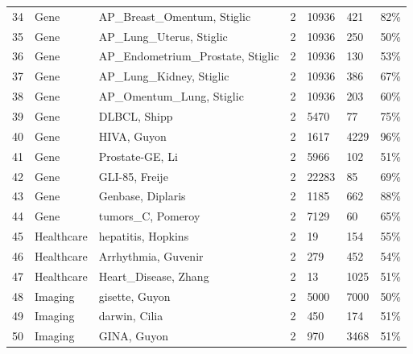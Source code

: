 \documentclass[preprint,12pt,authoryear]{elsarticle}
\begin{document}
{{\begin{longtable}{|c|p{1.9cm}|p{6.7cm}|c|p{0.75cm}|p{0.75cm}|p{0.75cm}|}
34 & Gene       & AP\_Breast\_Omentum, Stiglic \citeyearpar{stiglic2010stability}   & 2 & 10936 & 421   & 82\% \\
35 & Gene       & AP\_Lung\_Uterus, Stiglic \citeyearpar{stiglic2010stability}      & 2 & 10936 & 250   & 50\% \\
36 & Gene       & AP\_Endometrium\_Prostate, Stiglic \citeyearpar{stiglic2010stability} & 2 & 10936 & 130 & 53\% \\
37 & Gene       & AP\_Lung\_Kidney, Stiglic \citeyearpar{stiglic2010stability}      & 2 & 10936 & 386   & 67\% \\
38 & Gene       & AP\_Omentum\_Lung, Stiglic \citeyearpar{stiglic2010stability}     & 2 & 10936 & 203   & 60\% \\
39 & Gene       & DLBCL, Shipp \citeyearpar{shipp2002diffuse}                     & 2 & 5470  & 77    & 75\% \\
40 & Gene       & HIVA, Guyon \citeyearpar{guyon2006performance}                  & 2 & 1617  & 4229  & 96\% \\
41 & Gene       & Prostate-GE, Li \citeyearpar{li2017feature}                  & 2 & 5966  & 102   & 51\% \\
42 & Gene       & GLI-85, Freije \citeyearpar{freije2004gene}                      & 2 & 22283 & 85    & 69\% \\
43 & Gene       & Genbase, Diplaris \citeyearpar{diplaris2005protein}                 & 2 & 1185  & 662   & 88\% \\
44 & Gene       & tumors\_C, Pomeroy \citeyearpar{pomeroy2002prediction}            & 2 & 7129  & 60    & 65\% \\ \hline
45 & Healthcare & hepatitis, Hopkins \citeyearpar{hepatitis_46}                      & 2 & 19    & 154   & 55\% \\
46 & Healthcare & Arrhythmia, Guvenir \citeyearpar{arrhythmia_5}                     & 2 & 279   & 452   & 54\% \\
47 & Healthcare & Heart\_Disease, Zhang \citeyearpar{zhang2018integrating}         & 2 & 13    & 1025  & 51\% \\ \hline
48 & Imaging    & gisette, Guyon \citeyearpar{guyon2004result}                     & 2 & 5000  & 7000  & 50\% \\
49 & Imaging    & darwin, Cilia \citeyearpar{cilia2018experimental}                & 2 & 450   & 174   & 51\% \\
50 & Imaging    & GINA, Guyon \citeyearpar{guyon2006performance}                   & 2 & 970   & 3468  & 51\% \\ \hline

\end{longtable}}}
\end{document}
